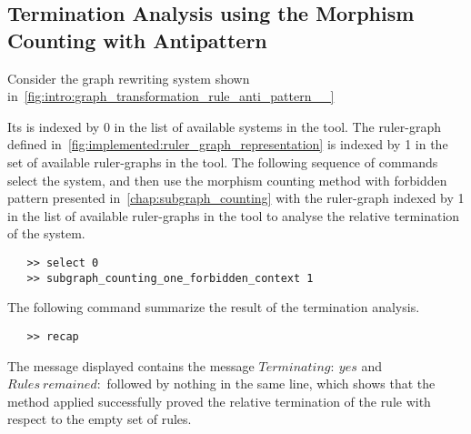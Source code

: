 \subsection{Termination Analysis using the Morphism Counting with Antipattern}
Consider the graph rewriting system shown in~\autoref{fig:intro:graph_transformation_rule_anti_pattern__} 
 \begin{figure}[!ht]
    \centering
{}
  \caption{}
  \label{fig:intro:graph_transformation_rule_anti_pattern___}
 \end{figure}
Its is indexed by \colorbox{Ivory2}{0} in
the list of available systems in the tool.
The ruler-graph defined in~\autoref{fig:implemented:ruler_graph_representation} is indexed by \colorbox{Ivory2}{1} in the set of available ruler-graphs in the tool.
The following sequence of commands select the system,
 and then use the morphism counting method with forbidden pattern presented in~\autoref{chap:subgraph_counting} with the ruler-graph indexed by \colorbox{Ivory2}{1} in the list of available ruler-graphs in the tool to analyse the relative termination of the system.
 \begin{verbatim}
   >> select 0
   >> subgraph_counting_one_forbidden_context 1
\end{verbatim}
The following command summarize the result of the termination analysis.
 \begin{verbatim}
   >> recap
\end{verbatim}
The message displayed
contains the message \colorbox{Ivory2}{$Terminating:\ yes$} and \colorbox{Ivory2}{$Rules\ remained:$} followed by nothing in the same line, which shows that the method applied successfully proved the relative termination of the rule with respect to the empty set of rules.

